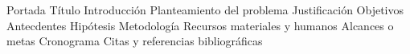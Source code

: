 Portada
Título
Introducción
Planteamiento del problema
Justificación
Objetivos
Antecdentes
Hipótesis
Metodología
Recursos materiales y humanos
Alcances o metas
Cronograma
Citas y referencias bibliográficas